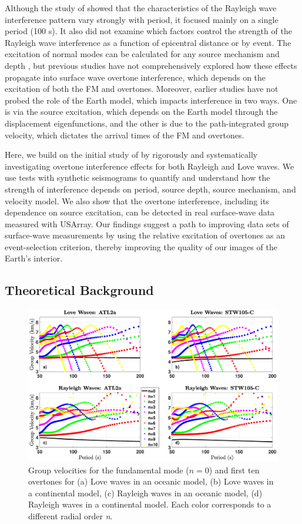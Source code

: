 \documentclass[extra,mreferee]{gji}
\begin{document}
Although the study of \citet{hariharan2020evidence} showed that the characteristics of the Rayleigh wave interference pattern vary strongly with period, it focused mainly on a single period (100 s). It also did not examine which factors control the strength of the Rayleigh wave interference as a function of epicentral distance or by event. The excitation of normal modes can be calculated for any source mechanism and depth \citep{dziewonski1981determination,dahlen1998theoretical}, but previous studies have not comprehensively explored how these effects propagate into surface wave overtone interference, which depends on the excitation of both the FM and overtones. Moreover, earlier studies have not probed the role of the Earth model, which impacts interference in two ways. One is via the source excitation, which depends on the Earth model through the displacement eigenfunctions, and the other is due to the path-integrated group velocity, which dictates the arrival times of the FM and overtones. 

Here, we build on the initial study of \citet{hariharan2020evidence} by rigorously and systematically investigating overtone interference effects for both Rayleigh and Love waves. We use tests with synthetic seismograms to quantify and understand how the strength of interference depends on period, source depth, source mechanism, and velocity model. We also show that the overtone interference, including its dependence on source excitation, can be detected in real surface-wave data measured with USArray. Our findings suggest a path to improving data sets of surface-wave measurements by using the relative excitation of overtones as an event-selection criterion, thereby improving the quality of our images of the Earth's interior.

 \subsection{Theoretical Background}

 \begin{figure}
 \includegraphics[width=1.0\textwidth]{Fig1_PostReviews.eps}
 \caption{Group velocities for the fundamental mode ($n=0$) and first ten overtones for (a) Love waves in an oceanic model, (b) Love waves in a continental model, (c) Rayleigh waves in an oceanic model, (d) Rayleigh waves in a continental model. Each color corresponds to a different radial order \textit{n}.}
 \end{figure}
 
\end{document}

